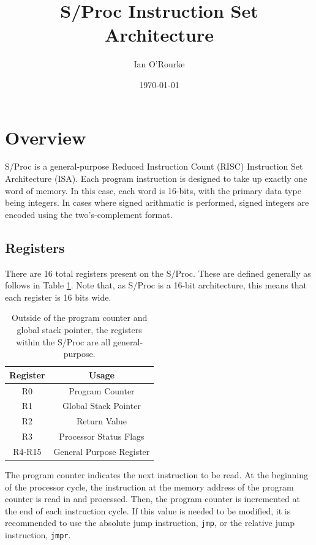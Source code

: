 \documentclass{article}
\title{S/Proc Instruction Set Architecture}
\author{Ian O'Rourke}
\date{\today \\ \titlelogoimage}
\begin{document}
\maketitle

\section{Overview}

S/Proc is a general-purpose Reduced Instruction Count (RISC) Instruction Set Architecture (ISA). Each program instruction is designed to take up exactly one word of memory. In this case, each word is 16-bits, with the primary data type being integers. In cases where signed arithmatic is performed, signed integers are encoded using the two's-complement format.

\subsection{Registers}

There are 16 total registers present on the S/Proc. These are defined generally as follows in Table \ref{table:register-setup}. Note that, as S/Proc is a 16-bit architecture, this means that each register is 16 bits wide.

\begin{table}[h!]
	\centering
	\begin{tabular}{c|c}
		\hline
		Register & Usage \\
		\hline
		R0 & Program Counter \\
		R1 & Global Stack Pointer \\
		R2 & Return Value \\
		R3 & Processor Status Flags \\
		R4-R15 & General Purpose Register \\
		\hline
	\end{tabular}
	\caption{Outside of the program counter and global stack pointer, the registers within the S/Proc are all general-purpose.}
	\label{table:register-setup}
\end{table}

The program counter indicates the next instruction to be read. At the beginning of the processor cycle, the instruction at the memory address of the program counter is read in and processed. Then, the program counter is incremented at the end of each instruction cycle. If this value is needed to be modified, it is recommended to use the absolute jump instruction, \texttt{jmp}, or the relative jump instruction, \texttt{jmpr}.
\end{document}
